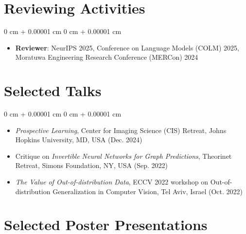 \documentclass[10pt, letterpaper]{article}
\newenvironment{highlights}{
    \begin{itemize}[
        topsep=0.10 cm,
        parsep=0.10 cm,
        partopsep=0pt,
        itemsep=0pt,
        leftmargin=0 cm + 10pt
    ]
}{
    \end{itemize}
} %
\newenvironment{onecolentry}{
    \begin{adjustwidth}{
        0 cm + 0.00001 cm
    }{
        0 cm + 0.00001 cm
    }
}{
    \end{adjustwidth}
} %
\begin{document}

    \section{Reviewing Activities}

    \begin{onecolentry}
        \begin{highlights}
            \item \textbf{Reviewer}: NeurIPS 2025, Conference on Language Models (COLM) 2025, Moratuwa Engineering Research Conference (MERCon) 2024
        \end{highlights}
    \end{onecolentry}


    \section{Selected Talks}

    \begin{onecolentry}
        \begin{highlights}
            \item \textit{Prospective Learning}, Center for Imaging Science (CIS) Retreat, Johns Hopkins University, MD, USA (Dec. 2024)
            \item Critique on \textit{Invertible Neural Networks for Graph Predictions}, Theorinet Retreat, Simons Foundation, NY, USA (Sep. 2022)
            \item \textit{The Value of Out-of-distribution Data}, ECCV 2022 workshop on Out-of-distribution Generalization in Computer Vision, Tel Aviv, Israel (Oct. 2022)
        \end{highlights}
    \end{onecolentry}


    \section{Selected Poster Presentations}
\end{document}
